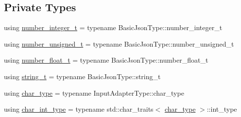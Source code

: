 \subsection*{Private Types}
\begin{DoxyCompactItemize}
\item 
using \hyperlink{classnlohmann_1_1detail_1_1lexer_a594e61f96c87b4464beeab681111ac0c}{number\+\_\+integer\+\_\+t} = typename Basic\+Json\+Type\+::number\+\_\+integer\+\_\+t
\item 
using \hyperlink{classnlohmann_1_1detail_1_1lexer_af6b19ef34b2e9ee2321cfaf62ee066cb}{number\+\_\+unsigned\+\_\+t} = typename Basic\+Json\+Type\+::number\+\_\+unsigned\+\_\+t
\item 
using \hyperlink{classnlohmann_1_1detail_1_1lexer_a438a78e53120fd2c3ea049161d4798cb}{number\+\_\+float\+\_\+t} = typename Basic\+Json\+Type\+::number\+\_\+float\+\_\+t
\item 
using \hyperlink{classnlohmann_1_1detail_1_1lexer_af85c01fd669d529ab93a9e1d80b62015}{string\+\_\+t} = typename Basic\+Json\+Type\+::string\+\_\+t
\item 
using \hyperlink{classnlohmann_1_1detail_1_1lexer_a98c69ad433d971104288baef813b2c68}{char\+\_\+type} = typename Input\+Adapter\+Type\+::char\+\_\+type
\item 
using \hyperlink{classnlohmann_1_1detail_1_1lexer_a46612a81a07dbbc6daef870ca4f959e4}{char\+\_\+int\+\_\+type} = typename std\+::char\+\_\+traits$<$ \hyperlink{classnlohmann_1_1detail_1_1lexer_a98c69ad433d971104288baef813b2c68}{char\+\_\+type} $>$\+::int\+\_\+type
\end{DoxyCompactItemize}
